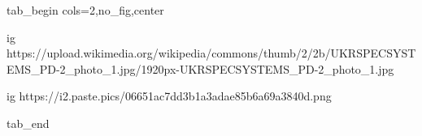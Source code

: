  
 
 
 
 


\ifcmt
  tab_begin cols=2,no_fig,center

  ig https://upload.wikimedia.org/wikipedia/commons/thumb/2/2b/UKRSPECSYSTEMS_PD-2_photo_1.jpg/1920px-UKRSPECSYSTEMS_PD-2_photo_1.jpg

	ig https://i2.paste.pics/06651ac7dd3b1a3adae85b6a69a3840d.png

  tab_end
\fi
